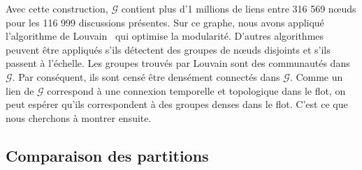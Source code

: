 Avec cette construction, $\mathcal{G}$ contient plus d'1 millions de liens entre 316 569 n\oe{}uds pour les 116 999 discussions présentes.
Sur ce graphe, nous avons appliqué l'algorithme de Louvain~\cite{Blondel2008a} qui optimise la modularité.
D'autres algorithmes peuvent être appliqués s'ils détectent des groupes de n\oe{}uds disjoints et s'ils passent à l'échelle.
Les groupes trouvés par Louvain sont des communautés dans $\mathcal{G}$.
Par conséquent, ils sont censé être densément connectés dans $\mathcal{G}$.
Comme un lien de $\mathcal{G}$ correspond à une connexion temporelle et topologique dans le flot, on peut espérer qu'ils correspondent à des groupes denses dans le flot.
C'est ce que nous cherchons à montrer ensuite.

\subsection{Comparaison des partitions}

